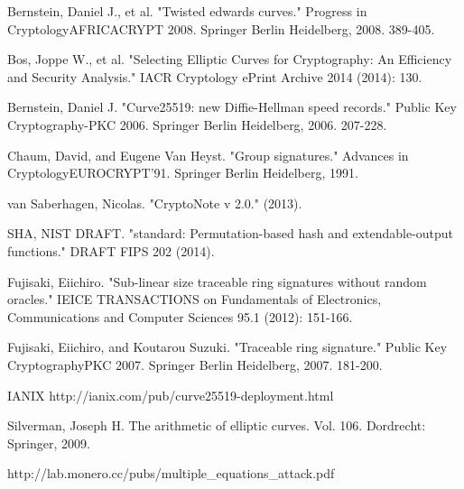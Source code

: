 \documentclass[12pt,english]{mrl}
\numberwithin{equation}{section}
\numberwithin{figure}{section}
\begin{document}
\begin{thebibliography}{BBJLP}
 Bernstein, Daniel J., et al. "Twisted
edwards curves." Progress in Cryptology\textendash{}AFRICACRYPT
2008. Springer Berlin Heidelberg, 2008. 389-405.

 Bos, Joppe W., et al. "Selecting
Elliptic Curves for Cryptography: An Efficiency and Security Analysis."
IACR Cryptology ePrint Archive 2014 (2014): 130.

 Bernstein, Daniel J. "Curve25519:
new Diffie-Hellman speed records." Public Key Cryptography-PKC
2006. Springer Berlin Heidelberg, 2006. 207-228.

 Chaum, David, and Eugene Van Heyst. "Group
signatures." Advances in Cryptology\textemdash{}EUROCRYPT\textquoteright{}91.
Springer Berlin Heidelberg, 1991.

 van Saberhagen, Nicolas. "CryptoNote
v 2.0." (2013).

 SHA, NIST DRAFT. "standard: Permutation-based
hash and extendable-output functions." DRAFT FIPS 202
(2014).

 Fujisaki, Eiichiro. "Sub-linear size
traceable ring signatures without random oracles." IEICE
TRANSACTIONS on Fundamentals of Electronics, Communications and Computer
Sciences 95.1 (2012): 151-166.

 Fujisaki, Eiichiro, and Koutarou Suzuki. "Traceable
ring signature." Public Key Cryptography\textendash{}PKC
2007. Springer Berlin Heidelberg, 2007. 181-200.

 IANIX http://ianix.com/pub/curve25519-deployment.html

 Silverman, Joseph H. The arithmetic of elliptic
curves. Vol. 106. Dordrecht: Springer, 2009.

 http://lab.monero.cc/pubs/multiple\_equations\_attack.pdf\end{thebibliography}
\end{document}
